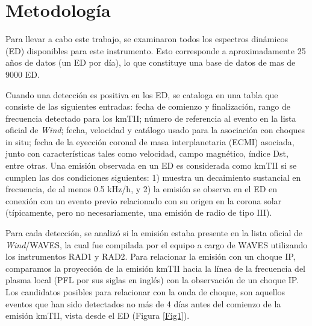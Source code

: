\documentclass[baaa]{baaa}
\begin{document}
\section{Metodología}

Para llevar a cabo este trabajo, se examinaron todos los espectros dinámicos (ED) disponibles para este instrumento. Esto corresponde a aproximadamente 25 años de datos (un ED por día), lo que constituye una base de datos de mas de 9000 ED. 

Cuando una detección es positiva en los ED, se cataloga en una tabla que consiste de las siguientes entradas: fecha de comienzo y finalización, rango de frecuencia detectado para los kmTII; número de referencia al evento en la lista oficial de \textit{Wind}; fecha, velocidad y catálogo usado para la asociación con choques in situ; fecha de la eyección coronal de masa interplanetaria (ECMI) asociada, junto con características tales como velocidad, campo magnético, índice Dst, entre otras. Una emisión observada en un ED es considerada como kmTII si se cumplen las dos condiciones siguientes: 1) muestra un decaimiento sustancial en frecuencia, de al menos 0.5 kHz/h, y 2) la emisión se observa en el ED en conexión con un evento previo relacionado con su origen en la corona solar (típicamente, pero no necesariamente, una emisión de radio de tipo III).


Para cada detección, se analizó si la emisión estaba presente en la lista oficial de \textit{Wind}/WAVES, la cual fue compilada por el equipo a cargo de WAVES utilizando los instrumentos RAD1 y RAD2.
Para relacionar la emisión con un choque IP, comparamos la proyección de la emisión kmTII hacia la línea de la frecuencia del plasma local (PFL por sus siglas en inglés) con la observación de un choque IP. Los candidatos posibles para relacionar con la onda de choque, son aquellos eventos que han sido detectados no más de 4 días antes del comienzo de la emisión kmTII, vista desde el ED (Figura \ref{Fig1}).
\end{document}
